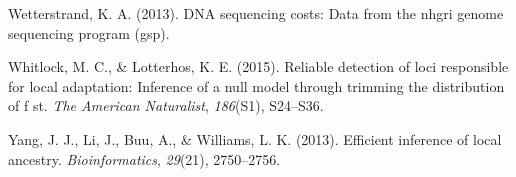 \documentclass[12pt,twoside]{reedthesis}
\begin{document}
  \hypertarget{ref-wetterstrand2013dna}{}
  Wetterstrand, K. A. (2013). DNA sequencing costs: Data from the nhgri
  genome sequencing program (gsp).
  
  \hypertarget{ref-whitlock2015reliable}{}
  Whitlock, M. C., \& Lotterhos, K. E. (2015). Reliable detection of loci
  responsible for local adaptation: Inference of a null model through
  trimming the distribution of f st. \emph{The American Naturalist},
  \emph{186}(S1), S24--S36.
  
  \hypertarget{ref-yang2013efficient}{}
  Yang, J. J., Li, J., Buu, A., \& Williams, L. K. (2013). Efficient
  inference of local ancestry. \emph{Bioinformatics}, \emph{29}(21),
  2750--2756.
  
\end{document}
